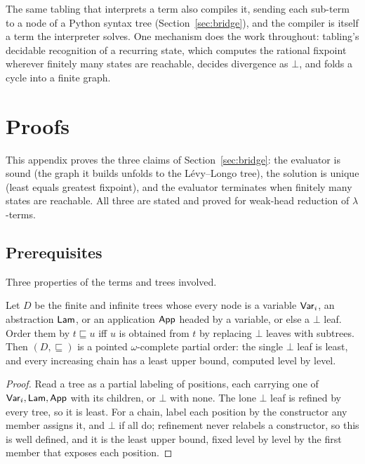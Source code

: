 The same tabling that interprets a term also compiles it, sending each sub-term to a node of a Python syntax tree (Section~\ref{sec:bridge}), and the compiler is itself a term the interpreter solves. One mechanism does the work throughout: tabling's decidable recognition of a recurring state, which computes the rational fixpoint wherever finitely many states are reachable, decides divergence as $\bot$, and folds a cycle into a finite graph.

\fi %

\ifColambdaBody


\fi

\ifColambdaAppendix
\appendix

\section{Proofs}\label{app:faithful}
This appendix proves the three claims of Section~\ref{sec:bridge}: the evaluator is sound (the graph it builds unfolds to the L\'evy--Longo tree), the solution is unique (least equals greatest fixpoint), and the evaluator terminates when finitely many states are reachable. All three are stated and proved for weak-head reduction of $\lambda$-terms.

\subsection{Prerequisites}

Three properties of the terms and trees involved.

\begin{lemma}\label{lem:order-llt}
  Let $D$ be the finite and infinite trees whose every node is a variable $\mathsf{Var}_i$, an abstraction
  $\mathsf{Lam}$, or an application $\mathsf{App}$ headed by a variable, or else a $\bot$ leaf. Order them by
  $t \sqsubseteq u$ iff $u$ is obtained from $t$ by replacing $\bot$ leaves with subtrees. Then
  $(D, \sqsubseteq)$ is a pointed $\omega$-complete partial order: the single $\bot$ leaf is least, and
  every increasing chain has a least upper bound, computed level by level.
\end{lemma}
\begin{proof}
  Read a tree as a partial labeling of positions, each carrying one of $\mathsf{Var}_i, \mathsf{Lam}, \mathsf{App}$
  with its children, or $\bot$ with none. The lone $\bot$ leaf is refined by every tree, so it is
  least. For a chain, label each position by the constructor any member assigns it, and $\bot$ if all
  do; refinement never relabels a constructor, so this is well defined, and it is the least upper
  bound, fixed level by level by the first member that exposes each position.
\end{proof}

